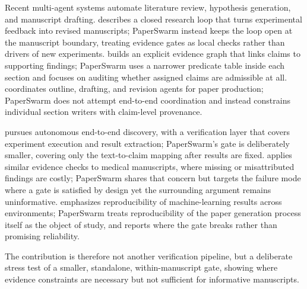 Recent multi-agent systems automate literature review, hypothesis generation, and manuscript drafting. \citet{xia2026researchloop} describes a closed research loop that turns experimental feedback into revised manuscripts; PaperSwarm instead keeps the loop open at the manuscript boundary, treating evidence gates as local checks rather than drivers of new experiments. \citet{ren2026evigraph} builds an explicit evidence graph that links claims to supporting findings; PaperSwarm uses a narrower predicate table inside each section and focuses on auditing whether assigned claims are admissible at all. \citet{jha2026paperpilot} coordinates outline, drafting, and revision agents for paper production; PaperSwarm does not attempt end-to-end coordination and instead constrains individual section writers with claim-level provenance.

\citet{luo2026xscientist} pursues autonomous end-to-end discovery, with a verification layer that covers experiment execution and result extraction; PaperSwarm's gate is deliberately smaller, covering only the text-to-claim mapping after results are fixed. \citet{nam2026medsci} applies similar evidence checks to medical manuscripts, where missing or misattributed findings are costly; PaperSwarm shares that concern but targets the failure mode where a gate is satisfied by design yet the surrounding argument remains uninformative. \citet{gaddipati2026mlreplicate} emphasizes reproducibility of machine-learning results across environments; PaperSwarm treats reproducibility of the paper generation process itself as the object of study, and reports where the gate breaks rather than promising reliability.

The contribution is therefore not another verification pipeline, but a deliberate stress test of a smaller, standalone, within-manuscript gate, showing where evidence constraints are necessary but not sufficient for informative manuscripts.
